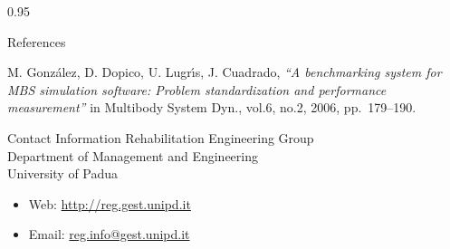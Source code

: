 \documentclass[final]{beamer}
\newlength{\onecolwid}
\begin{document}
\begin{frame}[t]
\begin{columns}[t]
\begin{column}{0.95\onecolwid}
\begin{block}{References}

\begin{thebibliography}{99}

 M. Gonz{\'a}lez, D. Dopico, U. Lugr{\'\i}s, J. Cuadrado, \textit{``A benchmarking system for MBS simulation software: Problem standardization and performance measurement''} 	in Multibody System Dyn., vol.6, no.2,  2006, pp.~179--190.

\end{thebibliography}

\end{block}


\vspace{36cm}
\begin{alertblock}{Contact Information}
Rehabilitation Engineering Group\\Department of Management and Engineering\\ University of Padua


\begin{itemize}
\item Web: \href{http://reg.gest.unipd.it}{http://reg.gest.unipd.it}
\item Email: \href{mailto:reg.info@gest.unipd.it}{reg.info@gest.unipd.it}
\end{itemize}

\end{alertblock}


\end{column} %

\end{columns} %

\end{frame} %
\end{document}
